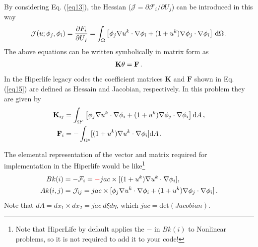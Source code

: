 \documentclass[]{article}
\begin{document}
By considering Eq. (\ref{eq13}), the Hessian ($\mathcal{J}=\partial \mathcal{F}_i/\partial U_j$) can be introduced in this way
\begin{equation}\label{eq14}
	\begin{aligned}
		\mathcal{J}(u;\phi_j,\phi_i) = {\partial F_i\over\partial U_j} = \int_\Omega \left\lbrack \phi_j \nabla u^k \cdot \nabla \phi_i + (1+u^k) \nabla \phi_j \cdot \nabla \phi_i \right\rbrack \, \mathrm{d}\Omega\thinspace .
	\end{aligned}
\end{equation}
The above equations can be written symbolically in matrix form as
\begin{equation}\label{eq15}
	\begin{aligned}
		\mathbf{K}\mathbf{\theta} = \mathbf{F}\thinspace.
	\end{aligned}
\end{equation}
In the Hiperlife legacy codes the coefficient matrices $\mathbf{K}$ and $\mathbf{F}$  shown in Eq. (\ref{eq15}) are defined as Hessain and Jacobian, respectively. In this problem they are given by
\begin{equation}\label{eq16}
	\begin{aligned}
		\mathbf{K}_{ij} &= \int_{\Omega^e} \left\lbrack \phi_j \nabla u^k \cdot \nabla \phi_i + (1+u^k) \nabla \phi_j \cdot \nabla \phi_i \right\rbrack\mathrm{d}A\thinspace,\\
		\mathbf{F}_i &=-\int_{\Omega^e} [(1+u^k)\nabla u^k\cdot \nabla \phi_i]\mathrm{d}A \thinspace.
	\end{aligned}
\end{equation}

The elemental representation of the vector and matrix required for implementation in the Hiperlife would be like\footnote{Note that HiperLife by default applies the $-$ in $Bk(i)$ to Nonlinear problems, so it is not required to add it to your code!}
\begin{equation}\label{eq17}
	\begin{aligned}[b]
		Bk(i) &= -\mathcal{F}_i = \mathcolor{red}{-}jac \times[(1+u^k)\nabla u^k\cdot \nabla \phi_i], \\
		Ak(i,j) &=  \mathcal{J}_{ij} = jac \times [\phi_j \nabla u^k \cdot \nabla \phi_i + (1+u^k) \nabla \phi_j \cdot \nabla \phi_i]\thinspace .
	\end{aligned}
\end{equation}
Note that $dA=dx_{1} \times dx_{2}=jac \ d\xi d\eta$, which $jac=\mathrm{det}(Jacobian)$.
\end{document}
